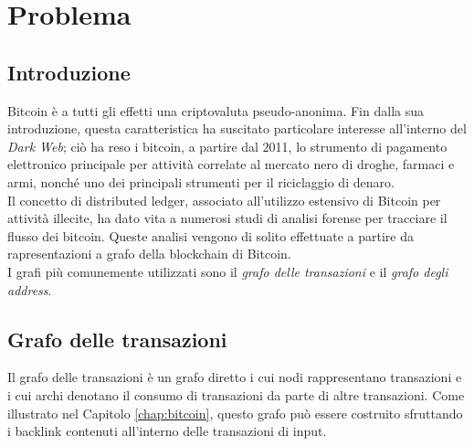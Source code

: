 \chapter{Problema}\label{chap:problema}

\section{Introduzione} \label{sec:problemaIntroduzione}

Bitcoin è a tutti gli effetti una criptovaluta pseudo-anonima. Fin dalla sua introduzione, questa  caratteristica  ha suscitato particolare interesse all’interno del \emph{Dark Web}; ciò ha reso i bitcoin, a partire dal 2011,  lo strumento di pagamento elettronico principale  per attività correlate al mercato nero di droghe, farmaci e armi, nonché uno dei principali strumenti per il riciclaggio di denaro.\\
Il concetto di distributed ledger, associato all’utilizzo estensivo di Bitcoin per attività illecite, ha dato vita a numerosi studi di analisi forense per tracciare il flusso dei bitcoin. Queste analisi vengono di solito   effettuate a partire da rapresentazioni a grafo della blockchain di Bitcoin.\\
I grafi più comunemente utilizzati sono il \emph{grafo delle transazioni} e il \emph{grafo degli address}.

\section{Grafo delle transazioni} \label{sec:grafoDelleTransazioniProblema}

Il grafo delle transazioni è un grafo diretto i cui nodi rappresentano transazioni e i cui archi denotano il consumo di transazioni da parte di altre transazioni. Come illustrato nel Capitolo \ref{chap:bitcoin}, questo grafo può essere costruito sfruttando i backlink contenuti all’interno delle transazioni di input.

